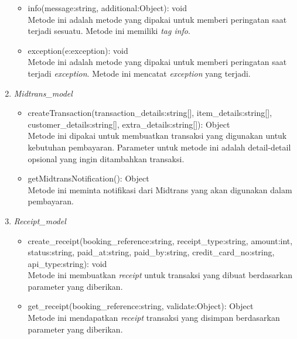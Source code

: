 \begin{enumerate}
\begin{itemize}
        \item info(message:string, additional:Object): void\\
        Metode ini adalah metode yang dipakai untuk memberi peringatan saat terjadi sesuatu. Metode ini memiliki \textit{tag info}.
        
        \item exception(e:exception): void\\
        Metode ini adalah metode yang dipakai untuk memberi peringatan saat terjadi \textit{exception}. Metode ini mencatat \textit{exception} yang terjadi.
    \end{itemize}
    
    \item \textit{Midtrans\_model}
    \begin{itemize}
        \item createTransaction(transaction\_details:string[], item\_details:string[], customer\_details:string[], extra\_details:string[]): Object\\
        Metode ini dipakai untuk membuatkan transaksi yang digunakan untuk kebutuhan pembayaran. Parameter untuk metode ini adalah detail-detail opsional yang ingin ditambahkan transaksi.
        
        \item getMidtransNotification(): Object\\
        Metode ini meminta notifikasi dari Midtrans yang akan digunakan dalam pembayaran.
        
    \end{itemize}
    
    \item \textit{Receipt\_model}
    \begin{itemize}
        \item create\_receipt(booking\_reference:string, receipt\_type:string, amount:int, status:string, paid\_at:string, paid\_by:string, credit\_card\_no:string, api\_type:string): void\\
        Metode ini membuatkan \textit{receipt} untuk transaksi yang dibuat berdasarkan parameter yang diberikan.
        
        \item get\_receipt(booking\_reference:string, validate:Object): Object\\
        Metode ini mendapatkan \textit{receipt} transaksi yang disimpan berdasarkan parameter yang diberikan.
        
    \end{itemize}
    
\end{enumerate}

